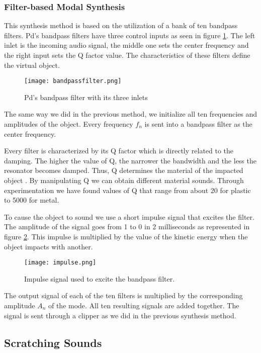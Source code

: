 \subsubsection{Filter-based Modal Synthesis}

This synthesis method is based on the utilization of a bank of ten bandpass filters. Pd's bandpass filters have three control inputs as seen in figure \ref{fig:pdbandpass}. The left inlet is the incoming audio signal, the middle one sets the center frequency and the right input sets the Q factor value. The characteristics of these filters define the virtual object.

\begin{figure}[H]
  \centering
    \texttt{[image: bandpassfilter.png]}
      \caption{Pd's bandpass filter with its three inlets}
      \label{fig:pdbandpass}
\end{figure} 

The same way we did in the previous method, we initialize all ten frequencies and amplitudes of the object. Every frequency $f_n$ is sent into a bandpass filter as the center frequency. 

Every filter is characterized by its Q factor which is directly related to the damping. The higher the value of Q, the narrower the bandwidth and the less the resonator becomes damped. Thus, Q determines the material of the impacted object \cite{gaver1993we}. By manipulating Q we can obtain different material sounds. Through experimentation we have found values of Q that range from about 20 for plastic to 5000 for metal. 

To cause the object to sound we use a short impulse signal that excites the filter. The amplitude of the signal goes from 1 to 0 in 2 milliseconds as represented in figure \ref{fig:impulse}. This impulse is multiplied by the value of the kinetic energy when the object impacts with another. 

\begin{figure}[H]
  \centering
    \texttt{[image: impulse.png]}
      \caption{Impulse signal used to excite the bandpass filter.}
      \label{fig:impulse}
\end{figure} 

The output signal of each of the ten filters is multiplied by the corresponding amplitude $A_n$ of the mode. All ten resulting signals are added together. The signal is sent through a clipper as we did in the previous synthesis method.

\subsection{Scratching Sounds}

